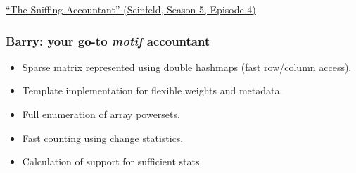 \documentclass[aspectratio=169, 9pt, handout]{beamer}
\begin{document}
\begin{frame}[c]
	\centering
	
	\pause
	\vfill\raggedright {\footnotesize \href{https://en.wikipedia.org/wiki/The_Sniffing_Accountant}{``The Sniffing Accountant'' (Seinfeld, Season 5, Episode 4)}}
\end{frame}

\begin{frame}[c]
	\frametitle{Barry: your go-to \textit{motif} accountant}
	\centering
\begin{minipage}[m]{.33\linewidth}
	\small
\begin{itemize}
	\item<1-> Sparse matrix represented using double hashmaps (fast row/column access).
	\item<2-> Template implementation for flexible weights and metadata.
	\item<3-> Full enumeration of array powersets.
	\item<4-> Fast counting using change statistics.
	\item<5-> Calculation of support for sufficient stats.
\end{itemize}
\end{minipage}\hfill
\begin{minipage}[m]{.65\linewidth}
	\begin{figure}
	\begin{minipage}[m]{.49\linewidth}

\end{minipage}
\end{figure}
\end{minipage}
\end{frame}
\end{document}
